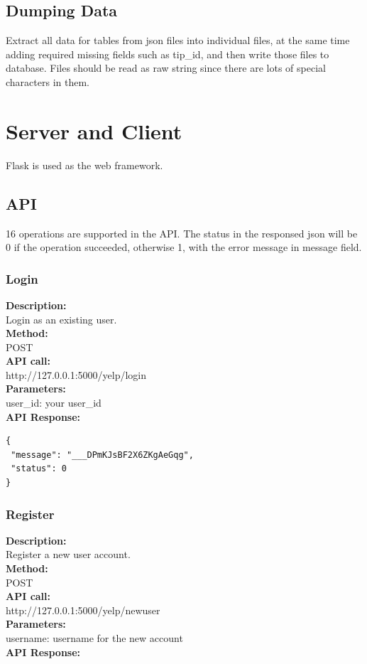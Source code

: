 \documentclass[12pt]{article}
\begin{document}
\subsection{Dumping Data}
Extract all data for tables from json files into individual files, at the same time adding required missing fields such as tip\_id, and then write those files to database. Files should be read as raw string since there are lots of special characters in them.
\section{Server and Client}\label{section-api}
Flask is used as the web framework.
\subsection{API}
16 operations are supported in the API. The status in the responsed json will be 0 if the operation succeeded, otherwise 1, with the error message in message field.

\subsubsection{Login}
\textbf{Description:}\\
Login as an existing user.\\
\textbf{Method:}\\
POST\\
\textbf{API call:}\\ 
http://127.0.0.1:5000/yelp/login\\
\textbf{Parameters:}\\
user\_id: your user\_id\\
\textbf{API Response:}

\begin{singlespacing}
\begin{lstlisting}
{
 "message": "___DPmKJsBF2X6ZKgAeGqg",
 "status": 0
}
\end{lstlisting}
\end{singlespacing}

\subsubsection{Register}
\textbf{Description:}\\
Register a new user account.\\
\textbf{Method:}\\
POST\\
\textbf{API call:}\\
http://127.0.0.1:5000/yelp/newuser\\
\textbf{Parameters:}\\
username: username for the new account\\
\textbf{API Response:}
\end{document}
